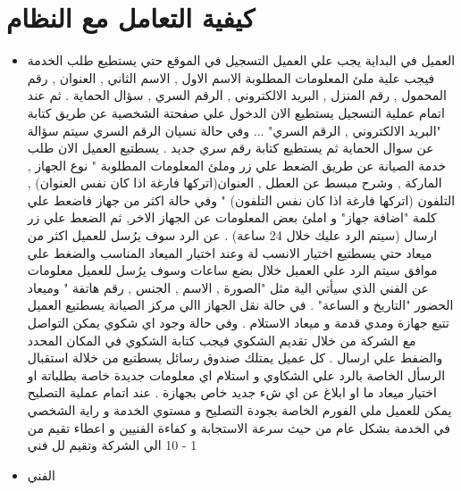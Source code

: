 \documentclass[25pt]{article}
\begin{document}
	\section{كيفية التعامل مع النظام}
	\begin{itemize}
		\item العميل
		\newline
		في البداية يجب علي العميل التسجيل في الموقع حتي يستطيع طلب الخدمة  فيجب علية ملئ المعلومات المطلوبة { الاسم الاول , الاسم الثاني , العنوان , رقم المحمول , رقم المنزل , البريد الالكتروني , الرقم السري , سؤال الحماية} .
		\newline
		ثم عند اتمام عملية التسجيل يستطيع الان الدخول علي صفحتة الشخصية عن طريق كتابة "البريد الالكتروني , الرقم السري" ... وفي حالة نسيان الرقم السري سيتم سؤالة عن سوال الحماية ثم يستطيع كتابة رقم سري جديد .
		\newline 
		يسطتيع العميل الان طلب خدمة الصيانة عن طريق الضعط علي زر وملئ المعلومات المطلوبة " نوع الجهاز , الماركة , وشرح مبسط عن العطل , العنوان(اتركها فارغة اذا كان نفس العنوان) , التلفون (اتركها فارغة اذا كان نفس التلفون) " وفي حالة اكثر من جهاز فاضعط علي كلمة "اضافة جهاز" و املئ بعض المعلومات عن الجهاز الاخر,
		ثم الضعط علي زر ارسال (سيتم الرد عليك خلال 24 ساعة) .
		\newline 
		عن الرد سوف يرُسل للعميل اكثر من ميعاد حتي يسطتيع اختيار الانسب لة وعند اختيار الميعاد المناسب والضغط علي موافق سيتم الرد علي العميل خلال بضع ساعات وسوف يرُسل للعميل معلومات عن الفني الذي سيأتي الية مثل "الصورة , الاسم , الجنس , رقم هاتفة " وميعاد الحضور "التاريخ و الساعة" .
		\newline 
		في حالة نقل الجهاز االي مركز الصيانة يسطتيع العميل تتبع جهازة ومدي قدمة و ميعاد الاستلام .
		\newline
		\newline  
		وفي حالة وجود اي شكوي يمكن التواصل مع الشركة من خلال تقديم الشكوي فيجب كتابة الشكوي في المكان المحدد والضفط علي ارسال .
		\newline
		كل عميل يمتلك صندوق رسائل يسطتيع من خلالة استقبال الرسأل الخاصة بالرد علي الشكاوي و استلام اي معلومات جديدة خاصة بطلباتة او اختيار ميعاد ما او ابلاغ عن اي شء جديد خاص بجهازة .
		\newline 
		عند اتمام عملية التصليح يمكن للعميل ملي الفورم 
		الخاصة بجودة التصليح و مستوي الخدمة و راية الشخصي في الخدمة بشكل عام من حيث سرعة الاستجابة و كفاءة الفنيين و اعطاء تقيم من 1 - 10 الي الشركة وتقيم لل فني
		\newline
		\newline
		\item الفني
		\newline

\end{itemize}
\end{document}
